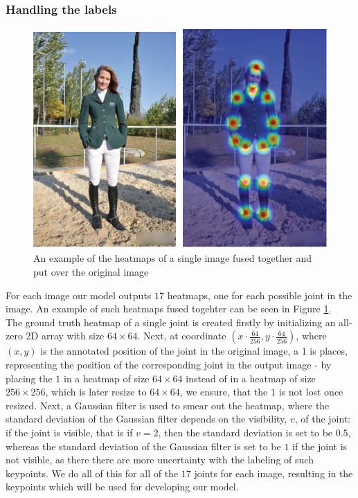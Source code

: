 \documentclass[./main.tex]{subfiles}
\begin{document}
\subsubsection{Handling the labels}
\begin{figure}[H]
    \centering
    \includegraphics[height = 4 cm]{./entities/heatmaps_ex.PNG}
    \caption{An example of the heatmaps of a single image fused together and put over the original image \cite{survey_1}}
    \label{fig:heatmaps_ex}
\end{figure}
For each image our model outputs $17$ heatmaps, one for each possible joint in the image. An example of such heatmaps fused togehter can be seen in Figure \ref{fig:heatmaps_ex}. \\
The ground truth heatmap of a single joint is created firstly by initializing an all-zero 2D array with size $64 \times 64$. Next, at coordinate $\left( x \cdot \frac{64}{256}, y \cdot \frac{64}{256} \right)$, where $(x, y)$ is the annotated position of the joint in the original image, a $1$ is places, representing the position of the corresponding joint in the output image - by placing the $1$ in a heatmap of size $64 \times 64$ instead of in a heatmap of size $256 \times 256$, which is later resize to $64 \times 64$, we ensure, that the $1$ is not lost once resized. Next, a Gaussian filter is used to smear out the heatmap, where the standard deviation of the Gaussian filter depends on the visibility, $v$, of the joint: if the joint is visible, that is if $v = 2$, then the standard deviation is set to be $0.5$, whereas the standard deviation of the Gaussian filter is set to be $1$ if the joint is not visible, as there there are more uncertainty with the labeling of such keypoints. We do all of this for all of the $17$ joints for each image, resulting in the keypoints which will be used for developing our model.
\end{document}
